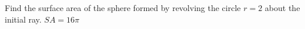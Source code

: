 {Find the surface area of the sphere formed by revolving the circle $r=2$ about the initial ray.
}
{$SA = 16\pi$
}
